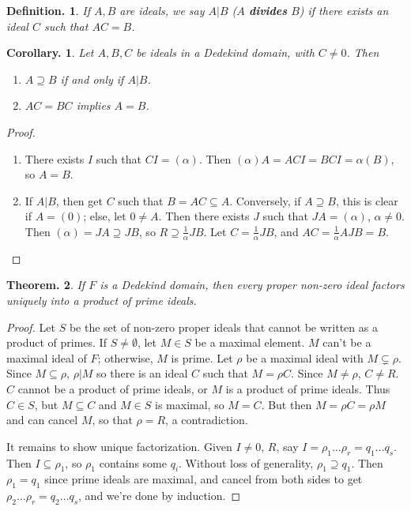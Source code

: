 \documentclass[11pt, a4paper]{memoir}
\theoremstyle{change}
\newtheorem{theorem}{Theorem.}[section]
\newtheorem{corollary}[theorem]{Corollary.}
\theoremstyle{plain}
\theoremstyle{nonumberplain}
\newtheorem{definition}{Definition.}
\newtheorem{proof}{Proof}
\begin{document}
\begin{definition}
    If $A,B$ are ideals, we say $A|B$ ($A$ \textbf{divides} $B$) if there exists an ideal $C$ such that $AC=B$.
\end{definition}
\begin{corollary}
    Let $A,B,C$ be ideals in a Dedekind domain, with $C\neq 0$.
    Then
    \begin{enumerate}[nolistsep,label=(\roman*)]
        \item $A\supseteq B$ if and only if $A|B$.
        \item $AC=BC$ implies $A=B$.
    \end{enumerate}
\end{corollary}
\begin{proof}
    \begin{enumerate}[label=(\roman*)]
        \item There exists $I$ such that $CI=(\alpha)$.
            Then $(\alpha)A=ACI=BCI=\alpha(B)$, so $A=B$.
        \item If $A|B$, then get $C$ such that $B=AC\subseteq A$.
            Conversely, if $A\supseteq B$, this is clear if $A=(0)$; else, let $0\neq A$.
            Then there exists $J$ such that $JA=(\alpha)$, $\alpha\neq 0$.
            Then $(\alpha)=JA\supseteq JB$, so $R\supseteq\frac{1}{\alpha}JB$.
            Let $C=\frac{1}{\alpha}JB$, and $AC=\frac{1}{\alpha}AJB=B$.
    \end{enumerate}
\end{proof}
\begin{theorem}
    If $F$ is a Dedekind domain, then every proper non-zero ideal factors uniquely into a product of prime ideals.
\end{theorem}
\begin{proof}
    Let $S$ be the set of non-zero proper ideals that cannot be written as a product of primes.
    If $S\neq\emptyset$, let $M\in S$ be a maximal element.
    $M$ can't be a maximal ideal of $F$; otherwise, $M$ is prime.
    Let $\rho$ be a maximal ideal with $M\subsetneq\rho$.
    Since $M\subseteq\rho$, $\rho|M$ so there is an ideal $C$ such that $M=\rho C$.
    Since $M\neq\rho$, $C\neq R$.
    $C$ cannot be a product of prime ideals, or $M$ is a product of prime ideals.
    Thus $C\in S$, but $M\subseteq C$ and $M\in S$ is maximal, so $M=C$.
    But then $M=\rho C=\rho M$ and can cancel $M$, so that $\rho=R$, a contradiction.

    It remains to show unique factorization.
    Given $I\neq 0$, $R$, say $I=\rho_1\ldots\rho_r=q_1\ldots q_s$.
    Then $I\subseteq\rho_1$, so $\rho_1$ contains some $q_i$.
    Without loss of generality, $\rho_1\supseteq q_1$.
    Then $\rho_1=q_1$ since prime ideals are maximal, and cancel from both sides to get $\rho_2\ldots\rho_r=q_2\ldots q_s$, and we're done by induction.
\end{proof}
\end{document}

